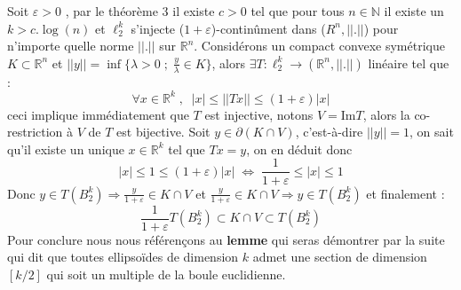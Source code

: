 \documentclass[12pt]{article}
\theoremstyle{definition}
\begin{document}
Soit $\varepsilon>0$ , par le théorème 3 il existe $c>0$ tel que pour tous $n\in\mathbb{N}$ il existe un $k>c.\log(n)$ et $\ell_2^k$ s'injecte ($1+\varepsilon$)-continûment dans ($R^n,||.||$) pour n’importe quelle norme $||.||$ sur $\mathbb{R}^n$. Considérons un compact convexe symétrique $K\subset \mathbb{R}^n$ et $||y||=\inf\Big\{\lambda>0\; ;\; \frac{y}{\lambda}\in K\Big\}$, alors $\exists T :\ell^{k}_2\to(\mathbb{R}^n,||.||)$ linéaire tel que :
\begin{equation*}
\forall x \in \mathbb{R}^k \; , \;\; |x|\leq ||Tx||\leq (1+\varepsilon)|x|
\end{equation*}
ceci implique immédiatement que $T$ est injective, notons $V=\text{Im}T$, alors la co-restriction à $V$ de $T$ est bijective.
Soit $y\in \partial(K\cap V)$, c'est-à-dire $||y||=1$, on sait qu'il existe un unique $x\in\mathbb{R}^k$ tel que $Tx=y$, on en déduit donc 
\begin{equation*}
|x|\leq 1 \leq (1+\varepsilon)|x|\; \iff\; \frac{1}{1+\varepsilon}\leq|x|\leq 1
\end{equation*}
Donc $y\in T(B_2^k)\Rightarrow \frac{y}{1+\varepsilon}\in K\cap V$ et $\frac{y}{1+\varepsilon}\in K\cap V\Rightarrow y\in T(B_2^k)$ et finalement :
\begin{equation*}
	\frac{1}{1+\varepsilon}T(B_2^k)\subset K\cap V \subset T(B_2^k)
\end{equation*}
Pour conclure nous nous référençons au \textbf{lemme } qui seras démontrer par la suite qui dit que toutes ellipsoïdes de dimension $k$ admet une section de dimension $[k/2]$ qui soit un multiple de la boule euclidienne. 

\newtheorem{lemme}[lemme]{Lemme}

\newtheorem{rem}[rem]{Remarque}

\newtheorem{proposition}[proposition]{Proposition}

\newtheorem{cor}[cor]{Corollaire}
\end{document}
